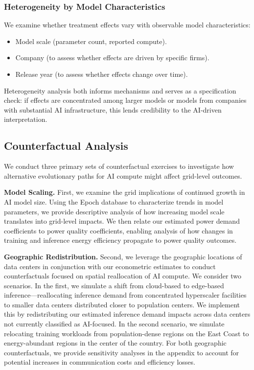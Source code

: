 \documentclass[sigconf,authordraft]{acmart}
\begin{document}
\subsubsection{Heterogeneity by Model Characteristics}

We examine whether treatment effects vary with observable model characteristics:
\begin{itemize}
    \item Model scale (parameter count, reported compute).
    \item Company (to assess whether effects are driven by specific firms).
    \item Release year (to assess whether effects change over time).
\end{itemize}
Heterogeneity analysis both informs mechanisms and serves as a specification check: if effects are concentrated among larger models or models from companies with substantial AI infrastructure, this lends credibility to the AI-driven interpretation.

\subsection{Counterfactual Analysis}\label{counterfactuals}%

We conduct three primary sets of counterfactual exercises to investigate how alternative evolutionary paths for AI compute might affect grid-level outcomes.

\textbf{Model Scaling.} First, we examine the grid implications of continued growth in AI model size. Using the Epoch database to characterize trends in model parameters, we provide descriptive analysis of how increasing model scale translates into grid-level impacts. We then relate our estimated power demand coefficients to power quality coefficients, enabling analysis of how changes in training and inference energy efficiency propagate to power quality outcomes.

\textbf{Geographic Redistribution.} Second, we leverage the geographic locations of data centers in conjunction with our econometric estimates to conduct counterfactuals focused on spatial reallocation of AI compute. We consider two scenarios. In the first, we simulate a shift from cloud-based to edge-based inference—reallocating inference demand from concentrated hyperscaler facilities to smaller data centers distributed closer to population centers. We implement this by redistributing our estimated inference demand impacts across data centers not currently classified as AI-focused. In the second scenario, we simulate relocating training workloads from population-dense regions on the East Coast to energy-abundant regions in the center of the country. For both geographic counterfactuals, we provide sensitivity analyses in the appendix to account for potential increases in communication costs and efficiency losses.
\end{document}
